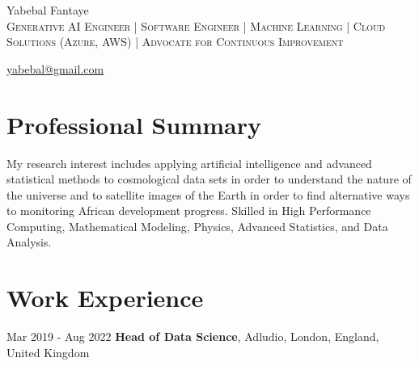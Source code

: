 \documentclass{modern} %
\begin{document}
\begin{header}
\fontsize{25pt}{25pt}\selectfont Yabebal Fantaye \\
\fontsize{10pt}{10pt}\selectfont\textsc{Generative AI Engineer | Software Engineer | Machine Learning | Cloud Solutions (Azure, AWS) | Advocate for Continuous Improvement}\\[2pt]%

\vspace{5pt}

\normalsize
 \quad
\kern 5.0pt%
    {\faEnvelope} \href{mailto:yabebal@gmail.com}{yabebal@gmail.com}  
 \quad
\kern 5.0pt%
 \quad
\kern 5.0pt%
 \quad

\vspace{5pt}
\end{header}

\section{Professional Summary}
\begin{onecolentry}
    {}{}{My research interest includes applying artificial intelligence and advanced statistical methods to cosmological data sets in order to understand the nature of the universe and to satellite images of the Earth in order to find alternative ways to monitoring African development progress.\newline%
\newline%
Skilled in High Performance Computing, Mathematical Modeling, Physics, Advanced Statistics, and Data Analysis.}
\end{onecolentry}

\section{Work Experience}
    \begin{twocolentry}{
        Mar 2019 -  Aug 2022
    }
        \textbf{Head of Data Science}, Adludio, London, England, United Kingdom
    \end{twocolentry}
\end{document}
